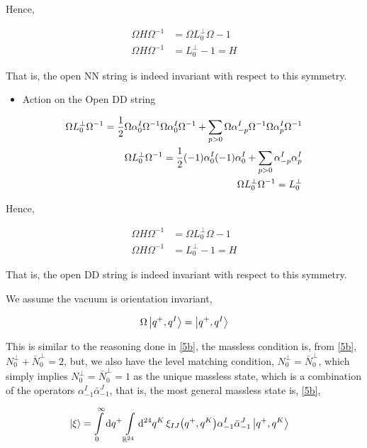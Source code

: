 Hence,

\begin{align*}
    \Omega H\Omega^{-1}&=\Omega L^\perp_0\Omega-1\\
    \Omega H\Omega^{-1}&=L^\perp_0-1=H
\end{align*}

That is, the open NN string is indeed invariant with respect to this symmetry.

\begin{itemize}
    \item Action on the Open DD string
\end{itemize}
\begin{align*}
    \Omega L^\perp_0\Omega^{-1}=\frac12\Omega\alpha_0^I\Omega^{-1}\Omega\alpha_0^I\Omega^{-1}+\sum\limits_{p>0}\Omega\alpha^I_{-p}\Omega^{-1}\Omega\alpha^I_p\Omega^{-1}\\
    \Omega L^\perp_0\Omega^{-1}=\frac12\qty(-1){\alpha}_0^I\qty(-1){\alpha}_0^I+\sum\limits_{p>0}{\alpha}^I_{-p}{\alpha}^I_p\\
    \Omega L^\perp_0\Omega^{-1}={L}_0^\perp
\end{align*}

Hence,

\begin{align*}
    \Omega H\Omega^{-1}&=\Omega L^\perp_0\Omega-1\\
    \Omega H\Omega^{-1}&=L^\perp_0-1=H
\end{align*}

That is, the open DD string is indeed invariant with respect to this symmetry.

\probitem{}

We assume the vacuum is orientation invariant,

\begin{align*}
    \Omega\ket{q^+,q^I}=\ket{q^+,q^I}
\end{align*}

This is similar to the reasoning done in \ref{5b}, the massless condition is, from \ref{5b}, $N^\perp_0+{\bar N}^\perp_0=2$, but, 
we also have the level matching condition, $N^\perp_0={\bar N}^\perp_0$, which simply implies $N^\perp_0={\bar N}^\perp_0=1$ as the unique 
massless state, which is a combination of the operators $\alpha^I_{-1}{\bar \alpha}^J_{-1}$, that is, the most general massless state is, \ref{5b}, 

\begin{align*}
    \ket{\xi}&=\int\limits_0^\infty\dd{q^+}\int\limits_{\mathbb R^{24}}\dd[24]{q^K}\xi_{IJ}\qty(q^+,q^K)\alpha^I_{-1}{\bar\alpha}^J_{-1}\ket{q^+,q^K}
\end{align*}

